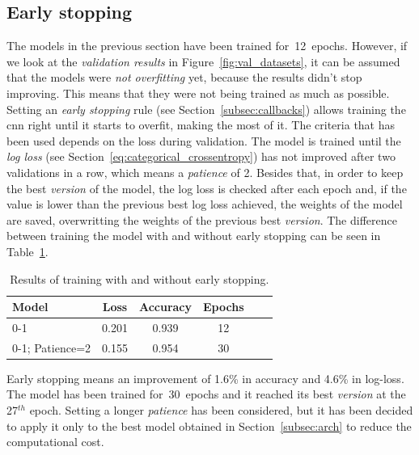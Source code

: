 \subsection{Early stopping}\label{subsec:early_stopping}
The models in the previous section have been trained for~12~epochs. However, if we look at the \emph{validation results} in Figure~\ref{fig:val_datasets}, it can be assumed that the models were \emph{not overfitting} yet, because the results didn't stop improving. This means that they were not being trained as much as possible. Setting an \emph{early stopping} rule (see Section~\ref{subsec:callbacks}) allows training the \gls{cnn} right until it starts to overfit, making the most of it. The criteria that has been used depends on the loss during validation. The model is trained until the \emph{log loss} (see Section~\ref{eq:categorical_crossentropy}) has not improved after two validations in a row, which means a \textit{patience} of 2. Besides that, in order to keep the best \textit{version} of the model, the log loss is checked after each epoch and, if the value is lower than the previous best log loss achieved, the weights of the model are saved, overwritting the weights of the previous best \textit{version}. The difference between training the model with and without early stopping can be seen in Table~\ref{tbl:earlystopping}.
\begin{table}
	\centering
	\begin{tabular}{l*{4}{c}r}
		\textbf{Model} & \textbf{Loss} & \textbf{Accuracy} & \textbf{Epochs} \\
		\hline
		0-1 & 0.201 & 0.939 & 12 \\
		0-1; Patience=2 & 0.155 & 0.954 & 30 \\
	\end{tabular}
	\caption{Results of training with and without early stopping.}
	\label{tbl:earlystopping}
\end{table}

Early stopping means an improvement of 1.6\% in accuracy and 4.6\% in log-loss. The model has been trained for~30~epochs and it reached its best \textit{version} at the 27$^{th}$ epoch. Setting a longer \textit{patience} has been considered, but it has been decided to apply it only to the best model obtained in Section~\ref{subsec:arch} to reduce the computational cost.

